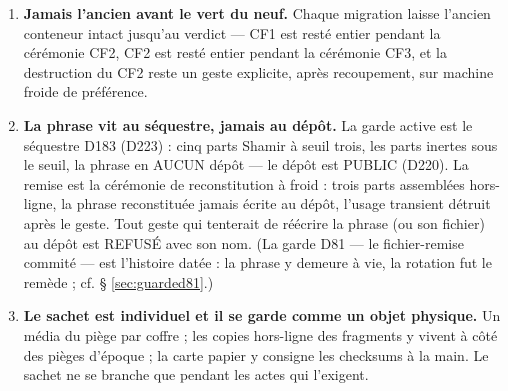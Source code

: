 \begin{enumerate}
\item \textbf{Jamais l'ancien avant le vert du neuf.} Chaque migration laisse l'ancien
conteneur intact jusqu'au verdict — CF1 est resté entier pendant la cérémonie CF2, CF2
est resté entier pendant la cérémonie CF3, et la destruction du CF2 reste un geste
explicite, après recoupement, sur machine froide de préférence.
\item \textbf{La phrase vit au séquestre, jamais au dépôt.} La garde active
est le séquestre D183 (D223) : cinq parts Shamir à seuil trois, les parts
inertes sous le seuil, la phrase en AUCUN dépôt — le dépôt est PUBLIC
(D220). La remise est la cérémonie de reconstitution à froid : trois parts
assemblées hors-ligne, la phrase reconstituée jamais écrite au dépôt,
l'usage transient détruit après le geste. Tout geste qui tenterait de
réécrire la phrase (ou son fichier) au dépôt est REFUSÉ avec son nom.
(La garde D81 — le fichier-remise commité — est l'histoire datée : la
phrase y demeure à vie, la rotation fut le remède ; cf. § \ref{sec:guarded81}.)
\item \textbf{Le sachet est individuel et il se garde comme un objet physique.} Un
média du piège par coffre ; les copies hors-ligne des fragments y vivent à côté des
pièges d'époque ; la carte papier y consigne les checksums à la main. Le sachet ne se
branche que pendant les actes qui l'exigent.
\end{enumerate}
